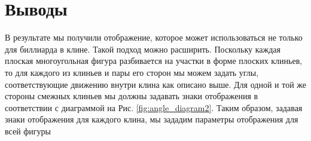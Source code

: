 \documentclass[a4paper]{article}
\begin{document}


\section{Выводы}

         В результате мы получили отображение, которое может использоваться не только для биллиарда в клине. Такой подход  можно расширить. Поскольку каждая плоская многоугольная фигура разбивается на участки в форме плоских клиньев, то для каждого из клиньев и пары его сторон мы можем задать углы, соответствующие движению внутри клина как описано выше. Для одной и той же стороны смежных клиньев мы должны задавать знаки отображения в соответствии с диаграммой на Рис. \ref{fig:angle_diagram2}. Таким образом, задавая знаки отображения для каждого клина, мы зададим параметры отображения для всей фигуры 
         
\end{document}
